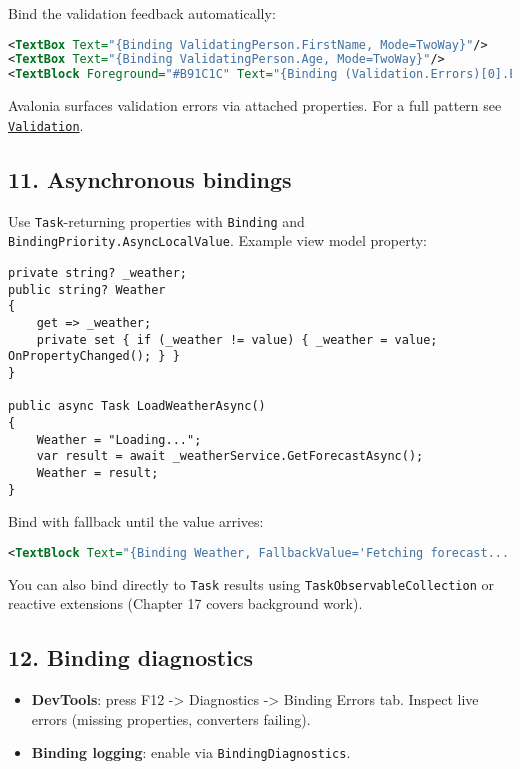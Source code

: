 Bind the validation feedback automatically:

\begin{lstlisting}[language=XML]
<TextBox Text="{Binding ValidatingPerson.FirstName, Mode=TwoWay}"/>
<TextBox Text="{Binding ValidatingPerson.Age, Mode=TwoWay}"/>
<TextBlock Foreground="#B91C1C" Text="{Binding (Validation.Errors)[0].ErrorContent, RelativeSource={RelativeSource Self}}"/>
\end{lstlisting}

Avalonia surfaces validation errors via attached properties. For a full
pattern see
\href{https://github.com/AvaloniaUI/Avalonia/blob/master/src/Avalonia.Controls/Validation}{\passthrough{\lstinline!Validation!}}.

\subsection{11. Asynchronous bindings}\label{asynchronous-bindings}

Use \passthrough{\lstinline!Task!}-returning properties with
\passthrough{\lstinline!Binding!} and
\passthrough{\lstinline!BindingPriority.AsyncLocalValue!}. Example view
model property:

\begin{lstlisting}
private string? _weather;
public string? Weather
{
    get => _weather;
    private set { if (_weather != value) { _weather = value; OnPropertyChanged(); } }
}

public async Task LoadWeatherAsync()
{
    Weather = "Loading...";
    var result = await _weatherService.GetForecastAsync();
    Weather = result;
}
\end{lstlisting}

Bind with fallback until the value arrives:

\begin{lstlisting}[language=XML]
<TextBlock Text="{Binding Weather, FallbackValue='Fetching forecast...'}"/>
\end{lstlisting}

You can also bind directly to \passthrough{\lstinline!Task!} results
using \passthrough{\lstinline!TaskObservableCollection!} or reactive
extensions (Chapter 17 covers background work).

\subsection{12. Binding diagnostics}\label{binding-diagnostics}

\begin{itemize}
\tightlist
\item
  \textbf{DevTools}: press F12 -\textgreater{} Diagnostics
  -\textgreater{} Binding Errors tab. Inspect live errors (missing
  properties, converters failing).
\item
  \textbf{Binding logging}: enable via
  \passthrough{\lstinline!BindingDiagnostics!}.
\end{itemize}

